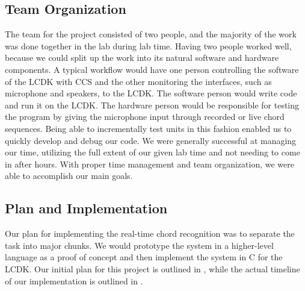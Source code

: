 \documentclass[journal]{IEEEtran}
\begin{document}
\subsection{Team Organization}
The team for the project consisted of two people, and the majority of the work was done together in the lab during lab time.
Having two people worked well, because we could split up the work into its natural software and hardware components.
A typical workflow would have one person controlling the software of the LCDK with CCS and the other monitoring the interfaces, such as microphone and speakers, to the LCDK.
The software person would write code and run it on the LCDK.
The hardware person would be responsible for testing the program by giving the microphone input through recorded or live chord sequences.
Being able to incrementally test units in this fashion enabled us to quickly develop and debug our code.
We were generally successful at managing our time, utilizing the full extent of our given lab time and not needing to come in after hours.
With proper time management and team organization, we were able to accomplish our main goals.


\subsection{Plan and Implementation}
Our plan for implementing the real-time chord recognition was to separate the task into major chunks.
We would prototype the system in a higher-level language as a proof of concept and then implement the system in C for the LCDK.
Our initial plan for this project is outlined in , while the actual timeline of our implementation is outlined in .
\end{document}
